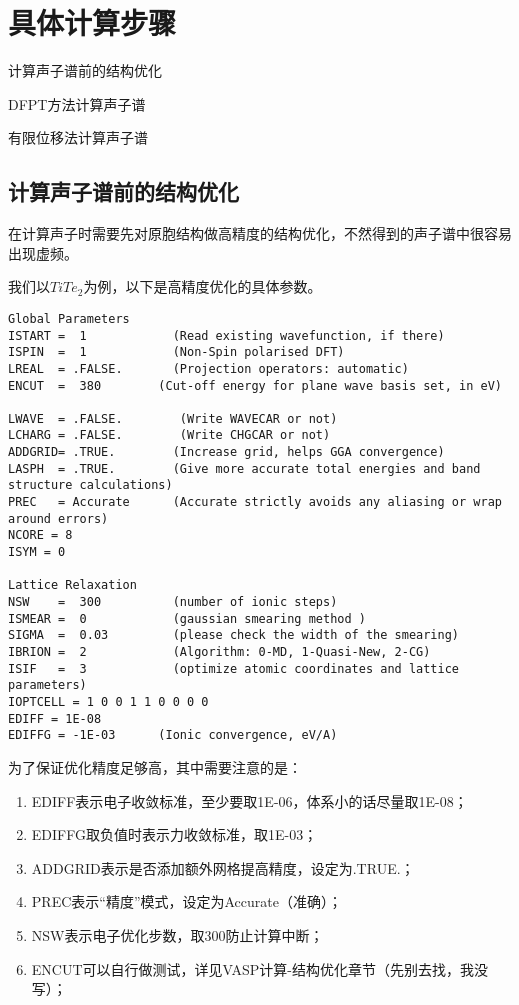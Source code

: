\section{具体计算步骤}\label{sec:具体计算步骤}


\begin{Abstract}
    \item 计算声子谱前的结构优化
    \item DFPT方法计算声子谱
    \item 有限位移法计算声子谱
\end{Abstract}

\subsection{计算声子谱前的结构优化}\label{sec:具体计算步骤-计算声子谱前的结构优化}

\begin{attention}
  在计算声子时需要先对原胞结构做高精度的结构优化，不然得到的声子谱中很容易出现虚频。  
\end{attention}

我们以$TiTe_2$为例，以下是高精度优化的具体参数。

\begin{lstlisting}[caption=INCAR]
Global Parameters
ISTART =  1            (Read existing wavefunction, if there)
ISPIN  =  1            (Non-Spin polarised DFT)
LREAL  = .FALSE.       (Projection operators: automatic)
ENCUT  =  380        (Cut-off energy for plane wave basis set, in eV)

LWAVE  = .FALSE.        (Write WAVECAR or not)
LCHARG = .FALSE.        (Write CHGCAR or not)
ADDGRID= .TRUE.        (Increase grid, helps GGA convergence)
LASPH  = .TRUE.        (Give more accurate total energies and band structure calculations)
PREC   = Accurate      (Accurate strictly avoids any aliasing or wrap around errors)
NCORE = 8 
ISYM = 0

Lattice Relaxation
NSW    =  300          (number of ionic steps)
ISMEAR =  0            (gaussian smearing method )
SIGMA  =  0.03         (please check the width of the smearing)
IBRION =  2            (Algorithm: 0-MD, 1-Quasi-New, 2-CG)
ISIF   =  3            (optimize atomic coordinates and lattice parameters)
IOPTCELL = 1 0 0 1 1 0 0 0 0
EDIFF = 1E-08
EDIFFG = -1E-03      (Ionic convergence, eV/A)
\end{lstlisting}

为了保证优化精度足够高，其中需要注意的是：
\begin{enumerate}
    \item EDIFF表示电子收敛标准，至少要取1E-06，体系小的话尽量取1E-08；
    \item EDIFFG取负值时表示力收敛标准，取1E-03；
    \item ADDGRID表示是否添加额外网格提高精度，设定为.TRUE.；
    \item PREC表示“精度”模式，设定为Accurate（准确）；
    \item NSW表示电子优化步数，取300防止计算中断；
    \item ENCUT可以自行做测试，详见VASP计算-结构优化章节（先别去找，我没写）；
\end{enumerate}

